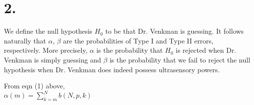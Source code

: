 \documentclass[12pt]{article}
\begin{document}
\section*{2.}
    \begin{flushleft} 
        We define the null hypothesis $H_0$ to be that Dr. Venkman is guessing. It follows naturally that $\alpha$, $\beta$ are the probabilities of Type I and Type II errors, respectively. More precisely, $\alpha$ is the probability that $H_0$ is rejected when Dr. Venkman is simply guessing and $\beta$ is the probability that we fail to reject the null hypothesis when Dr. Venkman does indeed possess ultrasensory powers.
    \end{flushleft}
    \begin{center}
        From eqn (1) above, \\
        $\alpha(m) =  \sum\limits_{k=m}^{N}{b(N, p, k)}$
    \end{center}
\end{document}
